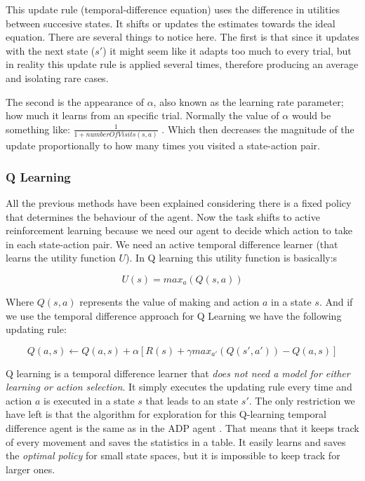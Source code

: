 This update rule (temporal-difference equation) uses the difference in utilities between succesive states. It shifts or updates the estimates towards the ideal equation. There are several things to notice here. The first is that since it updates with the next state ($s'$) it might seem like it adapts too much to every trial, but in reality this update rule is applied several times, therefore producing an average and isolating rare cases. \cite{rl} 

The second is the appearance of $\alpha$, also known as the learning rate parameter; how much it learns from an specific trial. Normally the value of  $\alpha$ would be something like: $\frac{1}{1+numberOfVisits(s,a)}$ \cite[p382]{ml_tom_mitchel}. Which then decreases the magnitude of the update proportionally to how many times you visited a state-action pair. 

\subsubsection{Q Learning}

All the previous methods have been explained considering there is a fixed policy that determines the behaviour of the agent. Now the task shifts to active reinforcement learning because we need our agent to decide which action to take in each state-action pair. We need an active temporal difference learner (that learns the utility function $U$). In Q learning this utility function is basically:s\cite{rl}

\begin{equation}
U(s) = max_a(Q(s,a))
\end{equation}

Where $Q(s,a)$ represents the value of making and action $a$ in a state $s$. And if we use the temporal difference approach for Q Learning we have the following updating rule:\cite{rl} 

\begin{equation}
Q(a,s) \leftarrow  Q(a,s)  + \alpha [R(s) + \gamma max_{a'}(Q(s',a')) - Q(a,s)]
\end{equation}

Q learning is a temporal difference learner that \textit{does not need a model for either learning or action selection}\cite[p775]{rl}. It simply executes the updating rule every time and action $a$ is executed in a state $s$ that leads to an state $s'$. The only restriction we have left is that the algorithm for exploration for this Q-learning temporal difference agent is the same as in the ADP agent \cite[p776]{rl} . That means that it keeps track of every movement and saves the statistics in a table. It easily learns and saves the \emph{optimal policy} for small state spaces, but it is impossible to keep track for larger ones. 

